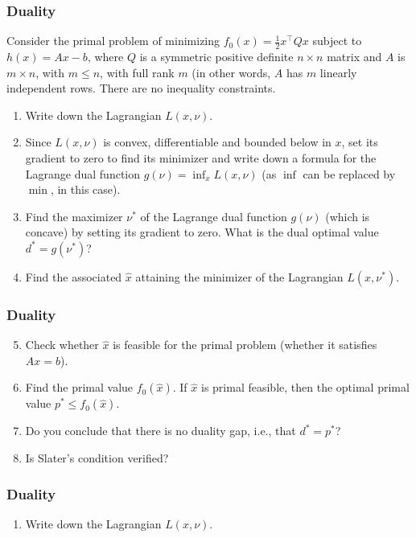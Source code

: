 \documentclass{beamer}
\begin{document}
\begin{frame}[t] 
\frametitle{Duality}
\vspace{-5pt}
Consider the primal problem of minimizing $f_0(x) = \frac{1}{2}x^\top Q x$ subject to $h(x) = Ax - b$, where $Q$ is a symmetric positive definite $n \times n$ matrix 
and $A$ is $m \times n$, with $m \leq n$, with full rank $m$ (in other words, $A$ has $m$ linearly independent rows. There are no inequality constraints.
\begin{enumerate}
\item Write down the Lagrangian $L(x, \nu)$.
\item Since $L(x,\nu)$ is convex, differentiable and bounded below in $x$, set its gradient to zero to find its minimizer and write down a formula for the Lagrange dual function $g(\nu) = \inf_x L(x,\nu)$ (as $\inf$ can be replaced by $\min$, in this case).
\item Find the maximizer $\nu^*$ of the Lagrange dual function $g(\nu)$ (which is concave) by setting its
gradient to zero. What is the dual optimal value $d^* = g(\nu^*)$?
\item Find the associated $\hat{x}$ attaining the minimizer of the Lagrangian $L(x, \nu^*)$.
\end{enumerate}
\pause
\end{frame}

\begin{frame}[t] 
\frametitle{Duality}
\vspace{-5pt}
\begin{enumerate}
\setcounter{enumi}{4}
\item Check whether $\hat{x}$ is feasible for the primal problem (whether it satisfies $Ax = b$).
\item Find the primal value $f_0(\hat{x})$. If $\hat{x}$ is primal feasible, then the optimal primal value $p^* \leq f_0(\hat{x})$.
\item Do you conclude that there is no duality gap, i.e., that $d^* = p^*$?
\item Is Slater's condition verified?
\end{enumerate}
\pause
\end{frame}

\begin{frame}[t] 
\frametitle{Duality}
\vspace{-5pt}
\begin{enumerate}
\setcounter{enumi}{0}
\item Write down the Lagrangian $L(x, \nu)$.
\end{enumerate}
\end{frame}
\end{document}
